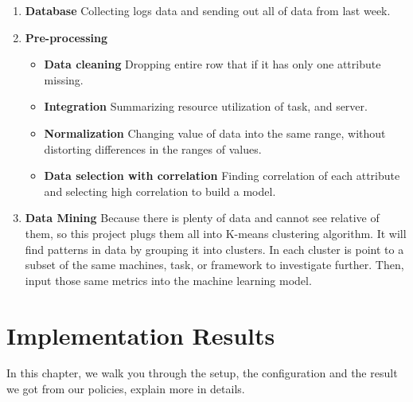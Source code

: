 \documentclass[12pt,oneside,openright,a4paper]{cpe-english-project}
\begin{document}
\begin{enumerate}
  \item \textbf{Database } Collecting logs data and sending out all of data from last week.
  \item \textbf{Pre-processing}
    \begin{itemize}
      \item \textbf{Data cleaning } Dropping entire row that if it has only one attribute missing. 
      \item \textbf{Integration } Summarizing resource utilization of task, and server.
      \item \textbf{Normalization } Changing value of data into the same range, without distorting differences in the ranges of values.
      \item \textbf{Data selection with correlation } Finding correlation of each attribute and selecting high correlation to build a model.
    \end{itemize}
  \item \textbf{Data Mining } Because there is plenty of data and cannot see relative of them, so this project plugs them all into K-means clustering algorithm. It will find patterns in data by grouping it into clusters. In each cluster is point to a subset of the same machines, task, or framework to investigate further. Then, input those same metrics into the machine learning model.
\end{enumerate}
\chapter{Implementation Results}

\hspace{10mm} In this chapter, we walk you through the setup, the configuration and the result we got from our policies, explain more in details.
\end{document}
